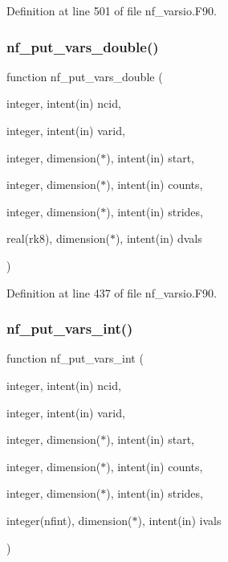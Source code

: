Definition at line 501 of file nf\+\_\+varsio.\+F90.

\mbox{\label{nf__varsio_8F90_a640788dd416a5c7ba6d3da2301a96691}} 
\subsubsection{\texorpdfstring{nf\+\_\+put\+\_\+vars\+\_\+double()}{nf\_put\_vars\_double()}}
{\footnotesize\ttfamily function nf\+\_\+put\+\_\+vars\+\_\+double (\begin{DoxyParamCaption}\item[{integer, intent(in)}]{ncid,  }\item[{integer, intent(in)}]{varid,  }\item[{integer, dimension($\ast$), intent(in)}]{start,  }\item[{integer, dimension($\ast$), intent(in)}]{counts,  }\item[{integer, dimension($\ast$), intent(in)}]{strides,  }\item[{real(rk8), dimension($\ast$), intent(in)}]{dvals }\end{DoxyParamCaption})}



Definition at line 437 of file nf\+\_\+varsio.\+F90.

\mbox{\label{nf__varsio_8F90_a6224b779eed20d70314cf48c39b9ae70}} 
\subsubsection{\texorpdfstring{nf\+\_\+put\+\_\+vars\+\_\+int()}{nf\_put\_vars\_int()}}
{\footnotesize\ttfamily function nf\+\_\+put\+\_\+vars\+\_\+int (\begin{DoxyParamCaption}\item[{integer, intent(in)}]{ncid,  }\item[{integer, intent(in)}]{varid,  }\item[{integer, dimension($\ast$), intent(in)}]{start,  }\item[{integer, dimension($\ast$), intent(in)}]{counts,  }\item[{integer, dimension($\ast$), intent(in)}]{strides,  }\item[{integer(nfint), dimension($\ast$), intent(in)}]{ivals }\end{DoxyParamCaption})}



